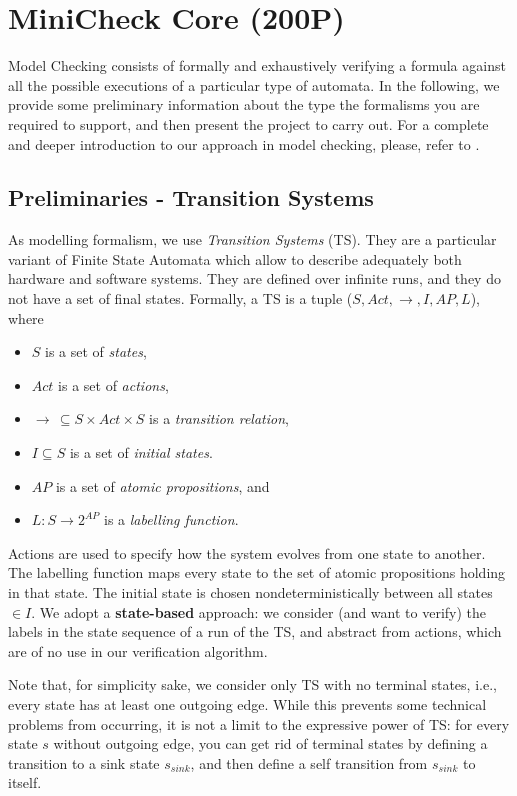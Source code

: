 \documentclass{article}
\begin{document}
\section{MiniCheck Core (200P)}

Model Checking consists of formally and exhaustively verifying a formula 
against all the possible executions of a particular type of automata. 
In the following, we provide some preliminary information 
about the type the formalisms you are required to support, 
and then present the project to carry out. 
For a complete and deeper introduction to our approach in model checking, 
please, refer to \cite{BaKa}.


\subsection{Preliminaries - Transition Systems}
\label{subsec-ts}
As modelling formalism, we use \emph{Transition Systems} (TS). They are a particular variant 
of Finite State Automata which allow to describe adequately both hardware and software systems. 
They are defined over infinite runs, and they do not have a set of final states. 
Formally, a TS is a tuple ($S, Act, \rightarrow, I, AP, L$), where 
\begin{itemize}
    \item $S$ is a set of \emph{states},
    \item $Act$ is a set of \emph{actions},
    \item $\longrightarrow\,\subseteq S \times Act \times S$ is a \emph{transition relation},
    \item $I \subseteq S$ is a set of \emph{initial states}.
    \item $AP$ is a set of \emph{atomic propositions}, and 
    \item $L : S \rightarrow 2^{AP}$ is a \emph{labelling function}.
\end{itemize}
Actions are used to specify how the system evolves from one state to another. The labelling function maps every state to the set of atomic propositions holding in that state. The initial state is chosen nondeterministically between all states $\in I$.
We adopt a \textbf{state-based} approach: we consider (and want to verify) the labels in the state sequence of a run of the TS, and abstract from actions, which are of no use in our verification algorithm. 

Note that, for simplicity sake, we consider only TS with no terminal states, i.e., every state has at least one outgoing edge. While this prevents some technical problems from occurring, it is not a limit to the expressive power of TS: for every state $s$ without outgoing edge, you can get rid of terminal states by defining a transition to a sink state $s_ {sink}$, and then define a self transition from $s_ {sink}$ to itself.
\end{document}
